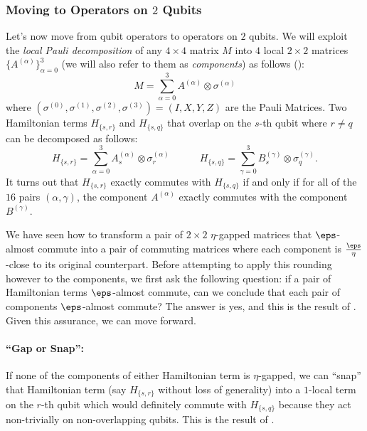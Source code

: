 \subsubsection{Moving to Operators on $2$ Qubits}
Let's now move from qubit operators to operators on $2$ qubits. We will exploit the \emph{local Pauli decomposition} of any $4 \times 4$ matrix $M$ into $4$ local $2 \times 2$ matrices $\{A^{(\alpha)}\}_{\alpha = 0}^{3}$ (we will also refer to them as \emph{components}) as follows ():
\begin{equation}
    M = \sum\limits_{\alpha = 0}^{3} A^{(\alpha)} \otimes \sigma^{(\alpha)}
\end{equation}
where $\left(\sigma^{(0)}, \sigma^{(1)}, \sigma^{(2)}, \sigma^{(3)}\right) = \left(I, X, Y, Z\right)$ are the Pauli Matrices. Two Hamiltonian terms $H_{\{s,r\}}$ and $H_{\{s, q\}}$ that overlap on the $s$-th qubit where $r \neq q$ can be decomposed as follows:
    \begin{equation}
        H_{\{s,r\}} = \sum\limits_{\alpha = 0}^{3} A_s^{(\alpha)} \otimes \sigma_r^{(\alpha)} \quad\quad\quad H_{\{s, q\}} = \sum\limits_{\gamma = 0}^{3} B_s^{(\gamma)} \otimes \sigma_q^{(\gamma)}.
    \end{equation}
It turns out that $H_{\{s,r\}}$ exactly commutes with $H_{\{s, q\}}$ if and only if for all of the $16$ pairs $\left(\alpha, \gamma\right)$, the component $A^{(\alpha)}$ exactly commutes with the component $B^{(\gamma)}$.

We have seen how to transform a pair of $2 \times 2$ $\eta$-gapped matrices that $\eps$-almost commute into a pair of commuting matrices where each component is $\frac{\eps}{\eta}$-close to its original counterpart. Before attempting to apply this rounding however to the components, we first ask the following question: if a pair of Hamiltonian terms $\eps$-almost commute, can we conclude that each pair of components $\eps$-almost commute? The answer is yes, and this is the result of . Given this assurance, we can move forward.

\paragraph{``Gap or Snap'':} If none of the components of either Hamiltonian term is $\eta$-gapped, we can ``snap'' that Hamiltonian term (say $H_{\{s,r\}}$ without loss of generality) into a $1$-local term on the $r$-th qubit which would definitely commute with $H_{\{s, q\}}$ because they act non-trivially on non-overlapping qubits. This is the result of .


